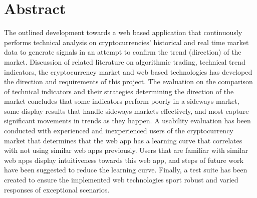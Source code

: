 %

%
\chapter*{Abstract}
\label{sec:abstract}
\thispagestyle{empty}

The outlined development towards a web based application that continuously performs technical analysis on cryptocurrencies' historical and real time market data to generate signals in an attempt to confirm the trend (direction) of the market. Discussion of related literature on algorithmic trading, technical trend indicators, the cryptocurrency market and web based technologies has developed the direction and requirements of this project. The evaluation on the comparison of technical indicators and their strategies determining the direction of the market concludes that some indicators perform poorly in a sideways market, some  display results that handle sideways markets  effectively, and most capture significant movements in trends as they happen. A usability evaluation has been conducted with experienced and inexperienced users of the cryptocurrency market that determines that the web app has a learning curve that correlates with not using similar web apps previously. Users that are familiar with similar web apps display intuitiveness towards this web app, and steps of future work have been suggested to reduce the learning curve. Finally, a test suite has been created to ensure the implemented web technologies sport robust and varied responses of exceptional scenarios.

\newpage





